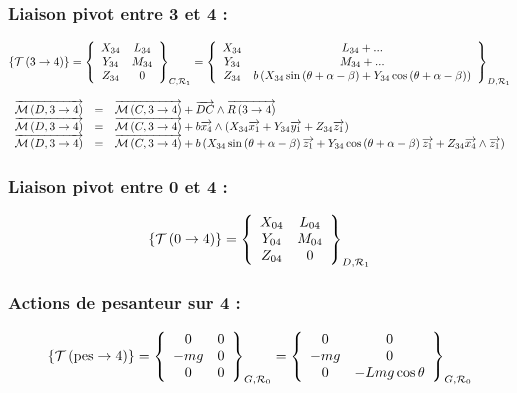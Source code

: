 \documentclass[10pt,fleqn]{article} %
\begin{document}









\subsubsection*{Liaison pivot entre 3 et 4 :}
$$
\torseurstat{T}{3}{4}
=\torseurcol{X_{34}}{Y_{34}}{Z_{34}}{L_{34}}{M_{34}}{0}{C,\mathcal{R}_1}
=\torseurcol{X_{34}}{Y_{34}}{Z_{34}}{L_{34}+...}{M_{34}+...}{ b \left( X_{34} \sin \left(\theta + \alpha -\beta\right)   +Y_{34} \cos \left(\theta + \alpha -\beta\right)  \right)}{D,\mathcal{R}_1}
$$

$$
\begin{array}{lcl}
\vectm{D}{3}{4} &=& \vectm{C}{3}{4} + \vect{DC} \wedge \vectf{3}{4} \\
\vectm{D}{3}{4} &=& \vectm{C}{3}{4} + b\vect{x_4} \wedge \left( X_{34} \vect{x_1} +Y_{34} \vect{y_1} +Z_{34} \vect{z_1}  \right)  \\
\vectm{D}{3}{4} &=& \vectm{C}{3}{4} + b \left( X_{34} \sin \left(\theta + \alpha -\beta\right) \vect{z_1}  +Y_{34} \cos \left(\theta + \alpha -\beta\right)\vect{z_1} +Z_{34} \vect{x_4} \wedge\vect{z_1}  \right)  \\
\end{array}
$$

 
 
 
\subsubsection*{Liaison pivot entre 0 et 4 :}
$$
\torseurstat{T}{0}{4}=\torseurcol{X_{04}}{Y_{04}}{Z_{04}}{L_{04}}{M_{04}}{0}{D,\mathcal{R}_1}
$$

\subsubsection*{Actions de pesanteur sur 4 :}
$$
\torseurstat{T}{\text{pes}}{4}
=\torseurcol{0}{-mg}{0}{0}{0}{0}{G,\mathcal{R}_0}
=\torseurcol{0}{-mg}{0}{0}{0}{-Lmg \cos \theta }{G,\mathcal{R}_0}
$$
\end{document}
